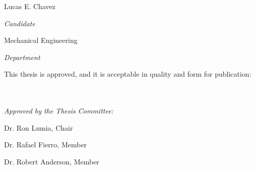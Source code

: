 \documentclass[letterpaper,10pt]{article}
\begin{document}
\vspace{0.8in}
\begin{Large}
 \noindent Lucas E. Chavez
 \end{Large}

 \noindent\makebox[\linewidth][l]{\rule{3.9in}{1pt}}
  \textit{Candidate} \vspace{0.5in}

 \begin{Large}
 \noindent Mechanical Engineering
 \end{Large}

  \noindent\makebox[\linewidth][l]{\rule{3.9in}{1pt}}
    \textit{Department} \vspace{0.4in}




   \noindent This thesis is approved, and it is acceptable in quality and form for publication: \\ \\ \\ \vspace{0.4in}
\begin{large}
 \noindent \textit{Approved by the Thesis Committee:} \vspace{0.4in}
 \end{large}

%
%
%


 Dr. Ron Lumia, Chair 
 \noindent\makebox[\linewidth]{\rule{5.5in}{1pt}}





 \noindent\makebox[\linewidth]{\rule{5.5in}{1pt}}

 Dr. Rafael Fierro, Member  \vfill



   \noindent\makebox[\linewidth]{\rule{5.5in}{1pt}}

 Dr. Robert Anderson, Member  \vfill
\end{document}

